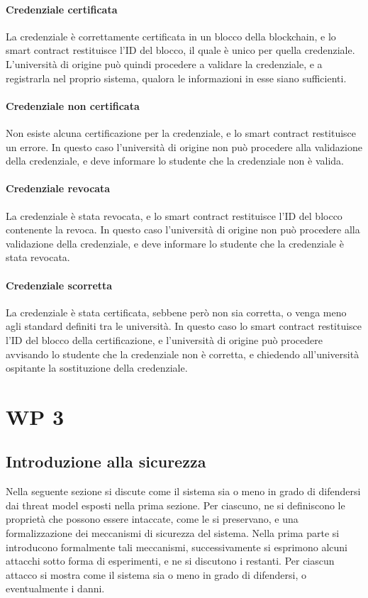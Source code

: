 \documentclass[a4paper,12pt]{article}
\begin{document}
\paragraph{Credenziale certificata} La credenziale è correttamente certificata in un blocco della blockchain, e lo smart contract restituisce l'ID del blocco, il quale è unico per quella credenziale. L'università di origine può quindi procedere a validare la credenziale, e a registrarla nel proprio sistema, qualora le informazioni in esse siano sufficienti.
\paragraph{Credenziale non certificata} Non esiste alcuna certificazione per la credenziale, e lo smart contract restituisce un errore. In questo caso l'università di origine non può procedere alla validazione della credenziale, e deve informare lo studente che la credenziale non è valida.
\paragraph{Credenziale revocata} La credenziale è stata revocata, e lo smart contract restituisce l'ID del blocco contenente la revoca. In questo caso l'università di origine non può procedere alla validazione della credenziale, e deve informare lo studente che la credenziale è stata revocata.
\paragraph{Credenziale scorretta} La credenziale è stata certificata, sebbene però non sia corretta, o venga meno agli standard definiti tra le università. In questo caso lo smart contract restituisce l'ID del blocco della certificazione, e l'università di origine può procedere avvisando lo studente che la credenziale non è corretta, e chiedendo all'università ospitante la sostituzione della credenziale.

\newpage
\section{WP 3}
\subsection{Introduzione alla sicurezza}
Nella seguente sezione si discute come il sistema sia o meno in grado di difendersi dai threat model esposti nella prima sezione. Per ciascuno, ne si definiscono le proprietà che possono essere intaccate, come le si preservano, e una formalizzazione dei meccanismi di sicurezza del sistema.
\newline Nella prima parte si introducono formalmente tali meccanismi, successivamente si esprimono alcuni attacchi sotto forma di esperimenti, e ne si discutono i restanti. Per ciascun attacco si mostra come il sistema sia o meno in grado di difendersi, o eventualmente i danni.
\end{document}
